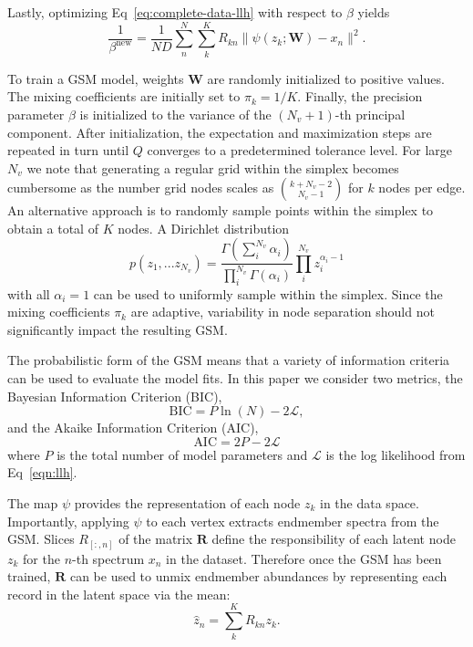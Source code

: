 \documentclass[remotesensing,article,submit,pdftex,moreauthors]{Definitions/mdpi}
\begin{document}
Lastly, optimizing Eq~\ref{eq:complete-data-llh} with respect to $\beta$ yields
\begin{equation}\label{eq:beta-update}
    \frac{1}{\beta^{\text{new}}}  = \frac{1}{ND}\sum\limits_n^N\sum\limits_k^K R_{kn}\lVert \psi(z_k; \mathbf{W}) - x_n \rVert^2.
\end{equation}

To train a GSM model, weights $\mathbf{W}$ are randomly initialized to positive values. The mixing coefficients are initially set to $\pi_k = 1/K$. Finally, the precision parameter $\beta$ is initialized to the variance of the $(N_v+1)$-th principal component. After initialization, the expectation and maximization steps are repeated in turn until $Q$ converges to a predetermined tolerance level. For large $N_v$ we note that generating a regular grid within the simplex becomes cumbersome as the number grid nodes scales as ${k + N_v - 2 \choose N_v - 1}$ for $k$ nodes per edge. An alternative approach is to randomly sample points within the simplex to obtain a total of $K$ nodes. A Dirichlet distribution 
\begin{equation}
    p(z_1,...z_{N_v}) = \frac{\Gamma(\sum_i^{N_v}\alpha_i)}{\prod_{i}^{N_v}\Gamma(\alpha_i)} \prod_{i}^{N_v} z_i^{\alpha_i-1}
\end{equation}
with all $\alpha_i=1$ can be used to uniformly sample within the simplex. Since the mixing coefficients $\pi_k$ are adaptive, variability in node separation should not significantly impact the resulting GSM.

The probabilistic form of the GSM means that a variety of information criteria can be used to evaluate the model fits. In this paper we consider two metrics, the Bayesian Information Criterion (BIC),
\begin{equation}
   \text{BIC} = P\ln(N) - 2\mathcal{L},
\end{equation}
and the Akaike Information Criterion (AIC),
\begin{equation}
    \text{AIC} = 2P - 2\mathcal{L}
\end{equation}
where $P$ is the total number of model parameters and $\mathcal{L}$ is the log likelihood from Eq~\ref{eqn:llh}.

The map $\psi$ provides the representation of each node $z_k$ in the data space. Importantly, applying $\psi$ to each vertex extracts endmember spectra from the GSM. Slices $R_{\left[:,n\right]}$ of the matrix $\mathbf{R}$ define the responsibility of each latent node $z_k$ for the $n$-th spectrum $x_n$ in the dataset. Therefore once the GSM has been trained, $\mathbf{R}$ can be used to unmix endmember abundances by representing each record in the latent space via the mean: 
\begin{equation}
    \hat{z}_n = \sum_k^K R_{kn}z_k.
\end{equation}
\end{document}
